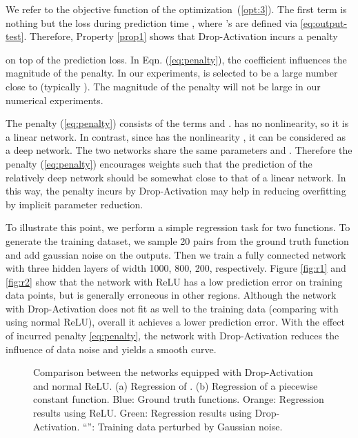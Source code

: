 \documentclass[11pt]{article}
\begin{document}
We refer to the objective function of the optimization~(\ref{opt:3}). The first term is nothing but the  loss during prediction time , where 's are defined via \eqref{eq:output-test}. Therefore, Property \ref{prop1} shows that Drop-Activation incurs a penalty

on top of the prediction loss. In Eqn. (\ref{eq:penalty}), the coefficient  influences the magnitude of the penalty. In our experiments,  is selected to be a large number close to  (typically ). The magnitude of the penalty will not be large in our numerical experiments.







The penalty (\ref{eq:penalty}) consists of the terms  and .  has no nonlinearity, so it is a linear network. In contrast, since  has the nonlinearity ,  it can be considered as a deep network. The two networks share the same parameters  and . Therefore the penalty (\ref{eq:penalty}) encourages weights  such that the prediction of the relatively deep network  should be somewhat close to that of a linear network. In this way, the penalty incurs by Drop-Activation may help in reducing overfitting by implicit parameter reduction. 

To illustrate this point, we perform a simple regression task for two functions. To generate the training dataset, we sample 20  pairs from the ground truth function and add gaussian noise on the outputs. Then we train a fully connected network with three hidden layers of width 1000, 800, 200, respectively. Figure \ref{fig:r1} and \ref{fig:r2} show that the network with ReLU has a low prediction error on training data points, but is generally erroneous in other regions. Although the network with Drop-Activation does not fit as well to the training data (comparing with using normal ReLU), overall it achieves a lower prediction error. With the effect of incurred penalty \eqref{eq:penalty}, the network with Drop-Activation reduces the influence of data noise and yields a smooth curve.

\begin{figure*}\centering
    \qquad
    \caption{Comparison between the networks equipped with Drop-Activation and normal ReLU. (a) Regression of . (b) Regression of a piecewise constant function. Blue:  Ground truth functions. Orange: Regression results using ReLU. Green: Regression results using Drop-Activation. ``'': Training data perturbed by Gaussian noise.}\label{fig:reg}\vspace{-0.5cm}
\end{figure*}
\end{document}
